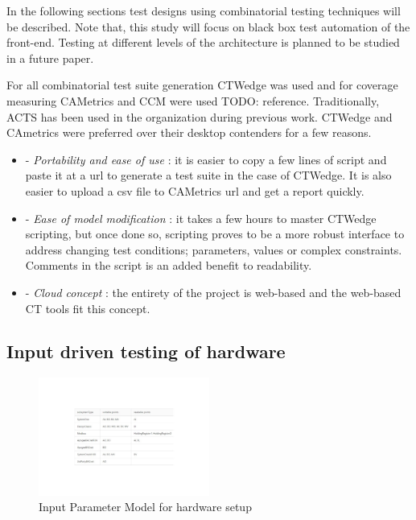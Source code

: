 \documentclass[conference]{IEEEtran}
\newcommand{\todo}[1]{}
\renewcommand{\todo}[1]{{\color{red} TODO: {#1}}}
\begin{document}
	In the following sections test designs using combinatorial testing techniques will be described. 
	Note that, this study will focus on black box test automation of the front-end. Testing at different levels of the architecture is planned to be studied in a future paper.

	For all combinatorial test suite generation CTWedge was used and for coverage measuring CAMetrics and CCM were used \todo{reference}.
	Traditionally, ACTS has been used in the organization during previous work.
	CTWedge and CAmetrics were preferred over their desktop contenders for a few reasons.

	\begin{itemize}
		\item [] - \textit{Portability and ease of use} : it is easier to copy a few lines of script and paste it at a url to generate a test suite in the case of CTWedge. It is also easier to upload a csv file to CAMetrics url and get a report quickly.
		\item [] - \textit{Ease of model modification} : it takes a few hours to master CTWedge scripting, but once done so, scripting proves to be a more robust interface to address changing test conditions; parameters, values or complex constraints. Comments in the script is an added benefit to readability. 
		\item [] - \textit{Cloud concept} : the entirety of the project is web-based and the web-based CT tools fit this concept.
	\end{itemize}
	
	\subsection{Input driven testing of hardware}

	\begin{figure}[!b]
		\includegraphics[width=0.50\textwidth,]{commandingIPM.pdf}
	\caption{Input Parameter Model for hardware setup}
	\label{fig:commandingIPM}
	\end{figure}
\end{document}
